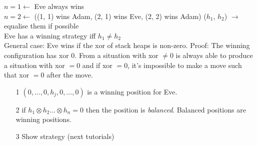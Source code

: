 \noindent
$n = 1 \leftarrow$ Eve always wins\\
$n = 2 \leftarrow$ ((1, 1) wins Adam, (2, 1) wins Eve, (2, 2) wins Adam)
($h_1$, $h_2$) $\rightarrow$ equalise them if possible\\
Eve has a winning strategy iff $h_1 \neq h_2$\\
General case: Eve wins if the xor of stack heaps is non-zero. Proof: The winning configuration has xor 0.
From a situation with xor $\neq 0$ is always able to produce a situation with xor $ = 0$ and if xor $ = 0$,
it's impossible to make a move such that xor $ = 0$ after the move.\\
\begin{itemize}
	\item[1] $(0, ..., 0, h_j, 0, ..., 0)$ is a winning position for Eve.
	\item[2] if $h_1 \otimes h_2 ... \otimes h_n = 0$ then the position is \textit{balanced}.
	Balanced positions are winning positions.
	\item[3] Show strategy (next tutorials)
\end{itemize}
